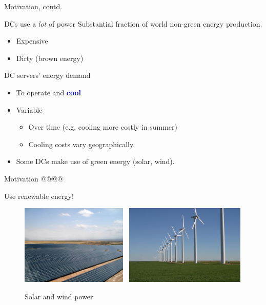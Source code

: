 \documentclass[xcolor=dvipsnames]{beamer}
\begin{document}
\begin{frame}{Motivation, contd.}
	\begin{block}{DCs use a \emph{lot} of power} 
		Substantial fraction of world non-green energy production.
		\begin{itemize}
			\item {Expensive}
			\item {Dirty (brown energy)}
		\end{itemize}	
	\end{block}

	\begin{block}{DC servers' energy demand} \vspace{-1mm}
		\begin{itemize}
		          \item{To operate and \textbf{\textcolor{blue}{cool}}}
			\item{Variable}
				\begin{itemize} 
					\item {Over time (e.g. cooling more costly in summer)}  %
					\item{Cooling costs vary geographically.}
		 		\end{itemize}				
			\item{Some DCs make use of green energy (solar, wind).}
		\end{itemize}
 	\end{block}
\end{frame}

\begin{frame}{Motivation @@@@}
	\begin{block}{Use renewable energy!}
		\begin{figure}
			\centering
			\includegraphics[height=1.5in]{PanSol2.jpg}~
			\includegraphics[height=1.5in]{GreenMountainWindFarm_Fluvanna_2004.jpg}
			\caption{Solar and wind power}
		\end{figure}
	\end{block}
\end{frame}
\end{document}
